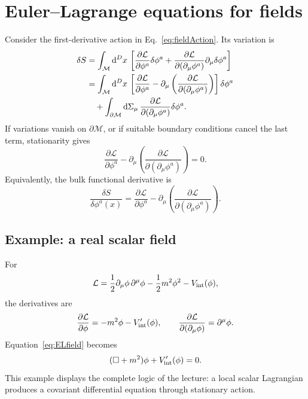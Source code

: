 \documentclass[11pt]{article}
\newcommand{\dd}{\mathrm{d}}
\newcommand{\Lag}{\mathcal{L}}
\newcommand{\cM}{\mathcal{M}}
\begin{document}
\section{Euler--Lagrange equations for fields}

Consider the first-derivative action in Eq.~\eqref{eq:fieldAction}. Its
variation is
\begin{align}
  \delta S
  &=\int_\cM\dd^D x\,
  \left[
    \frac{\partial\Lag}{\partial\phi^a}\delta\phi^a
    +\frac{\partial\Lag}{\partial(\partial_\mu\phi^a)}
      \partial_\mu\delta\phi^a
  \right]\notag\\
  &=\int_\cM\dd^D x\,
  \left[
    \frac{\partial\Lag}{\partial\phi^a}
    -\partial_\mu\left(
      \frac{\partial\Lag}{\partial(\partial_\mu\phi^a)}
    \right)
  \right]\delta\phi^a\notag\\
  &\quad+
  \int_{\partial\cM}\dd\Sigma_\mu\,
  \frac{\partial\Lag}{\partial(\partial_\mu\phi^a)}
  \delta\phi^a.
  \label{eq:variationField}
\end{align}
If variations vanish on \(\partial\cM\), or if suitable boundary conditions
cancel the last term, stationarity gives
\begin{equation}
  \boxed{
  \frac{\partial\Lag}{\partial\phi^a}
  -\partial_\mu\left(
    \frac{\partial\Lag}{\partial(\partial_\mu\phi^a)}
  \right)=0.}
  \label{eq:ELfield}
\end{equation}
Equivalently, the bulk functional derivative is
\begin{equation}
  \frac{\delta S}{\delta\phi^a(x)}
  =
  \frac{\partial\Lag}{\partial\phi^a}
  -\partial_\mu\left(
    \frac{\partial\Lag}{\partial(\partial_\mu\phi^a)}
  \right).
\end{equation}

\subsection{Example: a real scalar field}

For
\begin{equation}
  \Lag
  =\frac12\partial_\mu\phi\,\partial^\mu\phi
  -\frac12m^2\phi^2-V_{\rm int}(\phi),
  \label{eq:scalarLag}
\end{equation}
the derivatives are
\begin{equation}
  \frac{\partial\Lag}{\partial\phi}
  =-m^2\phi-V_{\rm int}'(\phi),
  \qquad
  \frac{\partial\Lag}{\partial(\partial_\mu\phi)}
  =\partial^\mu\phi.
\end{equation}
Equation~\eqref{eq:ELfield} becomes
\begin{equation}
  (\Box+m^2)\phi+V_{\rm int}'(\phi)=0.
  \label{eq:scalarEOM}
\end{equation}
This example displays the complete logic of the lecture: a local scalar
Lagrangian produces a covariant differential equation through stationary
action.
\end{document}
